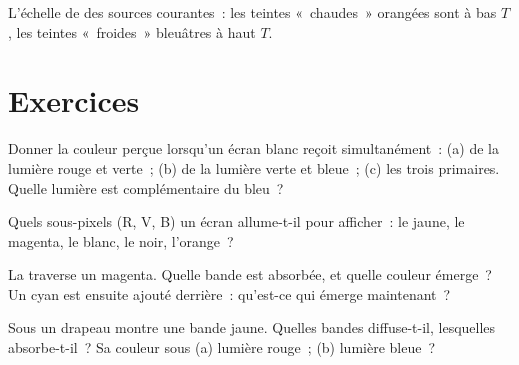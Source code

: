 \begin{omfigure}

{\small L'échelle de  des sources courantes~: les
teintes «~chaudes~» orangées sont à bas $T$, les teintes «~froides~»
bleuâtres à haut $T$.}
\end{omfigure}

\section{Exercices}

\begin{exercise}[$\star$]\label{exo:g11:color-light-sources:1}
Donner la couleur perçue lorsqu'un écran blanc reçoit simultanément~:
(a) de la lumière rouge et verte~; (b) de la lumière verte et bleue~;
(c) les trois primaires. Quelle lumière est complémentaire du bleu~?
\end{exercise}

\begin{exercise}[$\star$]\label{exo:g11:color-light-sources:2}
Quels sous-pixels (R, V, B) un écran allume-t-il pour afficher~: le
jaune, le magenta, le blanc, le noir, l'orange~?
\end{exercise}

\begin{exercise}[$\star$]\label{exo:g11:color-light-sources:3}
La  traverse un
 magenta. Quelle bande est absorbée,
et quelle couleur émerge~? Un 
cyan est ensuite ajouté derrière~: qu'est-ce qui émerge maintenant~?
\end{exercise}

\begin{exercise}[$\star$]\label{exo:g11:color-light-sources:4}
Sous  un drapeau montre une bande
jaune. Quelles bandes diffuse-t-il, lesquelles absorbe-t-il~? Sa
couleur sous (a) lumière rouge~; (b) lumière bleue~?
\end{exercise}

